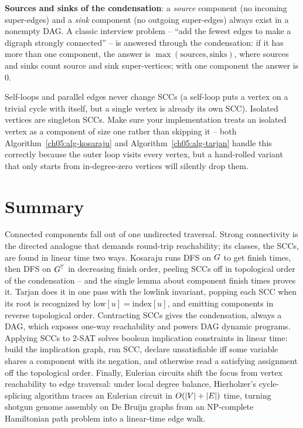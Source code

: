 \textbf{Sources and sinks of the condensation}: a \emph{source} component (no incoming super-edges) and a \emph{sink} component (no outgoing super-edges) always exist in a nonempty DAG. A classic interview problem -- ``add the fewest edges to make a digraph strongly connected'' -- is answered through the condensation: if it has more than one component, the answer is $\max(\text{sources}, \text{sinks})$, where sources and sinks count source and sink super-vertices; with one component the answer is $0$.

\begin{trapbox}
Self-loops and parallel edges never change SCCs (a self-loop puts a vertex on a trivial cycle with itself, but a single vertex is already its own SCC). Isolated vertices are singleton SCCs. Make sure your implementation treats an isolated vertex as a component of size one rather than skipping it -- both Algorithm~\ref{ch05:alg-kosaraju} and Algorithm~\ref{ch05:alg-tarjan} handle this correctly because the outer loop visits every vertex, but a hand-rolled variant that only starts from in-degree-zero vertices will silently drop them.
\end{trapbox}

\section*{Summary}

Connected components fall out of one undirected traversal. Strong connectivity is the directed analogue that demands round-trip reachability; its classes, the SCCs, are found in linear time two ways. Kosaraju runs DFS on $G$ to get finish times, then DFS on $G^{\!\top}$ in decreasing finish order, peeling SCCs off in topological order of the condensation -- and the single lemma about component finish times proves it. Tarjan does it in one pass with the lowlink invariant, popping each SCC when its root is recognized by $\mathrm{low}[u]=\mathrm{index}[u]$, and emitting components in reverse topological order. Contracting SCCs gives the condensation, always a DAG, which exposes one-way reachability and powers DAG dynamic programs. Applying SCCs to 2-SAT solves boolean implication constraints in linear time: build the implication graph, run SCC, declare unsatisfiable iff some variable shares a component with its negation, and otherwise read a satisfying assignment off the topological order. Finally, Eulerian circuits shift the focus from vertex reachability to edge traversal: under local degree balance, Hierholzer's cycle-splicing algorithm traces an Eulerian circuit in $O(\lvert V\rvert+\lvert E\rvert)$ time, turning shotgun genome assembly on De Bruijn graphs from an NP-complete Hamiltonian path problem into a linear-time edge walk.

